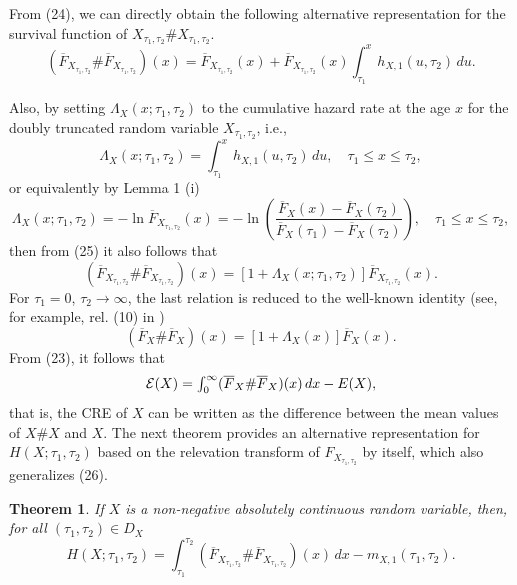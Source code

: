 \documentclass[11pt]{article}
\newtheorem{theorem}{Theorem}
\begin{document}
From (24), we can directly obtain the following alternative representation for the survival function of $X_{\tau_1,\tau_2}\# X_{\tau_1,\tau_2}$.
\begin{equation} \textstyle 
	(\overline{F}_{X_{\tau_1,\tau_2}}\# \overline{F}_{X_{\tau_1,\tau_2}})(x)=\overline{F}_{X_{\tau_1,\tau_2}}(x)+\overline{F}_{X_{\tau_1,\tau_2}}(x)\int_{\tau_1}^x h_{X,1}(u,\tau_2)\,du.
\end{equation}

Also, by setting $\Lambda_X(x;\tau_1,\tau_2)$ to the cumulative hazard rate at the age $x$ for the doubly truncated random variable $X_{\tau_1,\tau_2}$, i.e.,
$$ \textstyle \Lambda_X(x;\tau_1,\tau_2)=\int_{\tau_1}^x h_{X,1}(u,\tau_2)\,du,\quad \tau_1\leq x\leq \tau_2, $$
or equivalently by Lemma 1 (i)
$$ \textstyle \Lambda_X(x;\tau_1,\tau_2)=-\ln \overline{F}_{X_{\tau_1,\tau_2}}(x) = -\ln\left( \frac{\overline{F}_X(x)-\overline{F}_X(\tau_2)}{\overline{F}_X(\tau_1)-\overline{F}_X(\tau_2)} \right),\quad \tau_1\leq x\leq \tau_2, $$
then from (25) it also follows that
$$ \textstyle (\overline{F}_{X_{\tau_1,\tau_2}}\# \overline{F}_{X_{\tau_1,\tau_2}})(x) = \left[1+\Lambda_X(x;\tau_1,\tau_2)\right] \overline{F}_{X_{\tau_1,\tau_2}}(x). $$
For $\tau_1=0$, $\tau_2\to\infty$, the last relation is reduced to the well-known identity (see, for example, rel. (10) in \cite{Psarrakos2018})
$$ \textstyle (\overline{F}_X\# \overline{F}_X)(x) = [1+\Lambda_X(x)]\overline{F}_X(x). $$
From (23), it follows that
\begin{equation} \textstyle 
	\textstyle \mathcal{E}(X)=\int_0^\infty (\overline{F}_X\# \overline{F}_X)(x)\,dx - E(X),
\end{equation}
that is, the CRE of $X$ can be written as the difference between the mean values of $X\# X$ and $X$. The next theorem provides an alternative representation for $H(X;\tau_1,\tau_2)$ based on the relevation transform of $F_{X_{\tau_1,\tau_2}}$ by itself, which also generalizes (26).

 
\begin{theorem}
	If $X$ is a non-negative absolutely continuous random variable, then, for all $(\tau_1,\tau_2)\in D_X$
	\begin{equation} \textstyle 
		H(X;\tau_1,\tau_2)=\int_{\tau_1}^{\tau_2} (\overline{F}_{X_{\tau_1,\tau_2}}\# \overline{F}_{X_{\tau_1,\tau_2}})(x)\,dx - m_{X,1}(\tau_1,\tau_2).
	\end{equation}
\end{theorem}
\end{document}

